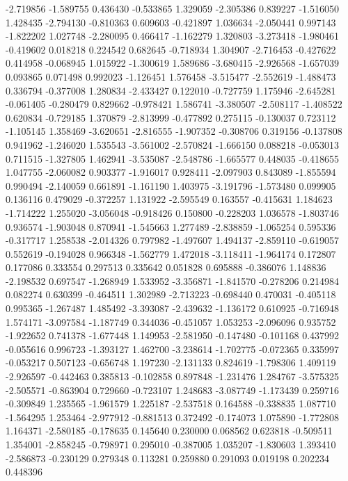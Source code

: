 -2.719856
-1.589755
0.436430
-0.533865
1.329059
-2.305386
0.839227
-1.516050
1.428435
-2.794130
-0.810363
0.609603
-0.421897
1.036634
-2.050441
0.997143
-1.822202
1.027748
-2.280095
0.466417
-1.162279
1.320803
-3.273418
-1.980461
-0.419602
0.018218
0.224542
0.682645
-0.718934
1.304907
-2.716453
-0.427622
0.414958
-0.068945
1.015922
-1.300619
1.589686
-3.680415
-2.926568
-1.657039
0.093865
0.071498
0.992023
-1.126451
1.576458
-3.515477
-2.552619
-1.488473
0.336794
-0.377008
1.280834
-2.433427
0.122010
-0.727759
1.175946
-2.645281
-0.061405
-0.280479
0.829662
-0.978421
1.586741
-3.380507
-2.508117
-1.408522
0.620834
-0.729185
1.370879
-2.813999
-0.477892
0.275115
-0.130037
0.723112
-1.105145
1.358469
-3.620651
-2.816555
-1.907352
-0.308706
0.319156
-0.137808
0.941962
-1.246020
1.535543
-3.561002
-2.570824
-1.666150
0.088218
-0.053013
0.711515
-1.327805
1.462941
-3.535087
-2.548786
-1.665577
0.448035
-0.418655
1.047755
-2.060082
0.903377
-1.916017
0.928411
-2.097903
0.843089
-1.855594
0.990494
-2.140059
0.661891
-1.161190
1.403975
-3.191796
-1.573480
0.099905
0.136116
0.479029
-0.372257
1.131922
-2.595549
0.163557
-0.415631
1.184623
-1.714222
1.255020
-3.056048
-0.918426
0.150800
-0.228203
1.036578
-1.803746
0.936574
-1.903048
0.870941
-1.545663
1.277489
-2.838859
-1.065254
0.595336
-0.317717
1.258538
-2.014326
0.797982
-1.497607
1.494137
-2.859110
-0.619057
0.552619
-0.194028
0.966348
-1.562779
1.472018
-3.118411
-1.964174
0.172807
0.177086
0.333554
0.297513
0.335642
0.051828
0.695888
-0.386076
1.148836
-2.198532
0.697547
-1.268949
1.533952
-3.356871
-1.841570
-0.278206
0.214984
0.082274
0.630399
-0.464511
1.302989
-2.713223
-0.698440
0.470031
-0.405118
0.995365
-1.267487
1.485492
-3.393087
-2.439632
-1.136172
0.610925
-0.716948
1.574171
-3.097584
-1.187749
0.344036
-0.451057
1.053253
-2.096096
0.935752
-1.922652
0.741378
-1.677448
1.149953
-2.581950
-0.147480
-0.101168
0.437992
-0.055616
0.996723
-1.393127
1.462700
-3.238614
-1.702775
-0.072365
0.335997
-0.053217
0.507123
-0.656748
1.197230
-2.131133
0.824619
-1.798306
1.409119
-2.926597
-0.442463
0.385813
-0.102858
0.897848
-1.231476
1.284767
-3.575325
-2.505571
-0.863904
0.729660
-0.723107
1.248683
-3.087749
-1.173439
0.259716
-0.309849
1.235565
-1.961579
1.225187
-2.537518
0.164588
-0.338835
1.087710
-1.564295
1.253464
-2.977912
-0.881513
0.372492
-0.174073
1.075890
-1.772808
1.164371
-2.580185
-0.178635
0.145640
0.230000
0.068562
0.623818
-0.509511
1.354001
-2.858245
-0.798971
0.295010
-0.387005
1.035207
-1.830603
1.393410
-2.586873
-0.230129
0.279348
0.113281
0.259880
0.291093
0.019198
0.202234
0.448396
